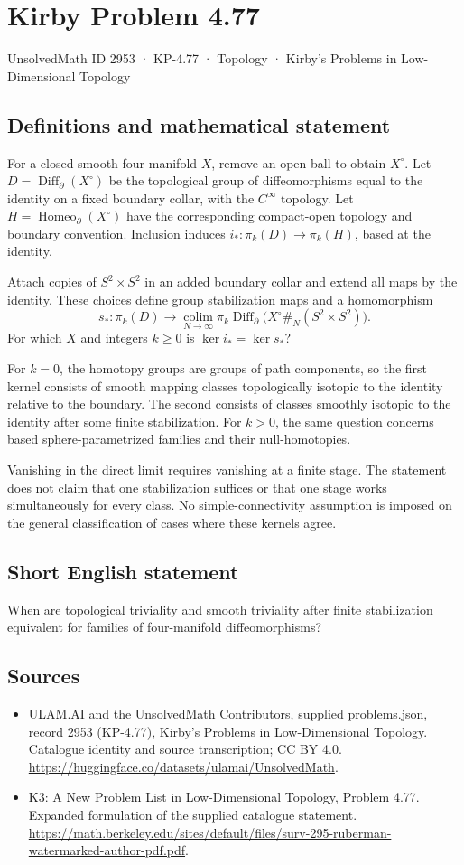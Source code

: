 \documentclass[11pt,a4paper]{article}
\begin{document}
\section*{Kirby Problem 4.77}\label{2953}
{\small UnsolvedMath ID 2953 · KP-4.77 · Topology · Kirby's Problems in Low-Dimensional Topology}
\subsection{Definitions and mathematical statement}
For a closed smooth four-manifold $X$, remove an open ball to obtain $X^\circ$. Let $D=\operatorname{Diff}_\partial(X^\circ)$ be the topological group of diffeomorphisms equal to the identity on a fixed boundary collar, with the $C^\infty$ topology. Let $H=\operatorname{Homeo}_\partial(X^\circ)$ have the corresponding compact-open topology and boundary convention. Inclusion induces $i_*:\pi_k(D)\to\pi_k(H)$, based at the identity.

Attach copies of $S^2\times S^2$ in an added boundary collar and extend all maps by the identity. These choices define group stabilization maps and a homomorphism
\[
s_*:\pi_k(D)\longrightarrow
\operatorname*{colim}_{N\to\infty}
\pi_k\operatorname{Diff}_\partial
\bigl(X^\circ\#_N(S^2\times S^2)\bigr).
\]
For which $X$ and integers $k\ge0$ is $\ker i_*=\ker s_*$?

For $k=0$, the homotopy groups are groups of path components, so the first kernel consists of smooth mapping classes topologically isotopic to the identity relative to the boundary. The second consists of classes smoothly isotopic to the identity after some finite stabilization. For $k>0$, the same question concerns based sphere-parametrized families and their null-homotopies.

Vanishing in the direct limit requires vanishing at a finite stage. The statement does not claim that one stabilization suffices or that one stage works simultaneously for every class. No simple-connectivity assumption is imposed on the general classification of cases where these kernels agree.
\subsection{Short English statement}
When are topological triviality and smooth triviality after finite stabilization equivalent for families of four-manifold diffeomorphisms?
\subsection{Sources}
\begin{itemize}
\item[S1] ULAM.AI and the UnsolvedMath Contributors, supplied problems.json, record 2953 (KP-4.77), Kirby's Problems in Low-Dimensional Topology. Catalogue identity and source transcription; CC BY 4.0.
\url{https://huggingface.co/datasets/ulamai/UnsolvedMath}.
\item[S2] K3: A New Problem List in Low-Dimensional Topology, Problem 4.77. Expanded formulation of the supplied catalogue statement.
\url{https://math.berkeley.edu/sites/default/files/surv-295-ruberman-watermarked-author-pdf.pdf}.
\end{itemize}
\end{document}
